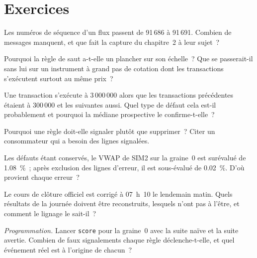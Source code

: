 \section{Exercices}

\begin{exercise}[$\star$]\label{exo:pl:data-quality-and-lineage:1}
Les numéros de séquence d'un flux passent de 91\,686 à 91\,691. Combien de messages manquent, et que fait la capture du chapitre~2
à leur sujet~?
\end{exercise}

\begin{exercise}[$\star$]\label{exo:pl:data-quality-and-lineage:2}
Pourquoi la règle de saut a-t-elle un plancher sur son échelle~? Que se passerait-il sans lui sur un instrument à grand pas de cotation dont les transactions
s'exécutent surtout au même prix~?
\end{exercise}

\begin{exercise}[$\star$]\label{exo:pl:data-quality-and-lineage:3}
Une transaction s'exécute à 3\,000\,000 alors que les transactions précédentes étaient à 300\,000 et les suivantes aussi. Quel type de défaut cela est-il probablement
et pourquoi la médiane prospective le confirme-t-elle~?
\end{exercise}

\begin{exercise}[$\star\star$]\label{exo:pl:data-quality-and-lineage:4}
Pourquoi une règle doit-elle signaler plutôt que supprimer~? Citer un consommateur qui a besoin des lignes signalées.
\end{exercise}

\begin{exercise}[$\star\star$]\label{exo:pl:data-quality-and-lineage:5}
Les défauts étant conservés, le VWAP de SIM2 sur la graine~0 est surévalué de 1.08~\%~; après exclusion des lignes d'erreur, il est sous-évalué de 0.02~\%. D'où provient chaque
erreur~?
\end{exercise}

\begin{exercise}[$\star\star$]\label{exo:pl:data-quality-and-lineage:6}
Le cours de clôture officiel est corrigé à 07~h~10 le lendemain matin. Quels résultats de la journée doivent être reconstruits, lesquels n'ont pas à l'être, et comment le lignage
le sait-il~?
\end{exercise}

\begin{exercise}[$\star\star\star$]\label{exo:pl:data-quality-and-lineage:7}
\emph{Programmation.} Lancer \texttt{score} pour la graine~0 avec la suite naïve et la suite avertie. Combien de faux signalements chaque règle déclenche-t-elle, et
quel événement réel est à l'origine de chacun~?
\end{exercise}

